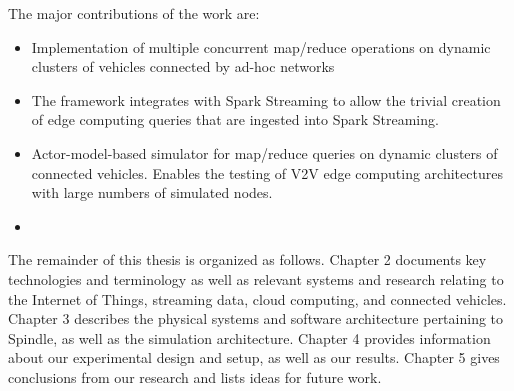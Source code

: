 \documentclass{thesis}
\begin{document}

    The major contributions of the work are:
        \begin{itemize}
            \item Implementation of multiple concurrent map/reduce operations on dynamic clusters of vehicles connected by ad-hoc networks
            \item The framework integrates with Spark Streaming to allow the trivial creation of edge computing queries that are ingested into Spark Streaming. %
            \item Actor-model-based simulator for map/reduce queries on dynamic clusters of connected vehicles.
                Enables the testing of V2V edge computing architectures with large numbers of simulated
                nodes.
            \item %
        \end{itemize}

    The remainder of this thesis is organized as follows.
    Chapter 2 documents key technologies and terminology as well as relevant systems and research relating
    to the Internet of Things, streaming data, cloud computing, and connected vehicles. Chapter 3
    describes the physical systems and software architecture pertaining to Spindle, as well as the
    simulation architecture. Chapter 4 provides information about our experimental design and setup,
    as well as our results. Chapter 5 gives conclusions from our research and lists ideas for future
    work.
\end{document}
